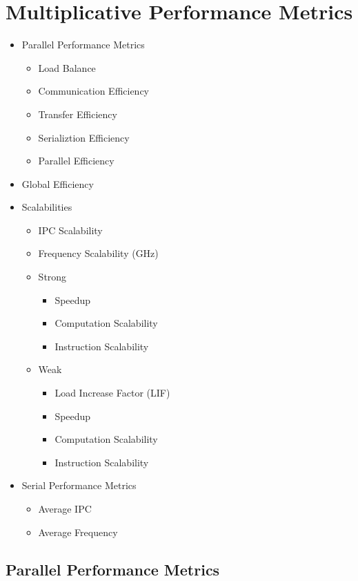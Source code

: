 \documentclass[article,12pt]{memoir}
\begin{document}
	\section{Multiplicative Performance Metrics}
	\begin{itemize}
		\item Parallel Performance Metrics
		\begin{itemize}
			\item Load Balance
			\item Communication Efficiency
			\item Transfer Efficiency
			\item Serializtion Efficiency
			\item Parallel Efficiency
		\end{itemize}
		\item Global Efficiency
		\item Scalabilities
		\begin{itemize}
			\item IPC Scalability
			\item Frequency Scalability (GHz)
			\item Strong
			\begin{itemize}
				\item Speedup
				\item Computation Scalability
				\item Instruction Scalability
			\end{itemize}
			\item Weak
			\begin{itemize}
				\item Load Increase Factor (LIF)
				\item Speedup
				\item Computation Scalability
				\item Instruction Scalability
			\end{itemize}
		\end{itemize}
		\item Serial Performance Metrics
		\begin{itemize}
			\item Average IPC
			\item Average Frequency
		\end{itemize}
	\end{itemize}
	
	\subsection{Parallel Performance Metrics}
	
\end{document}
